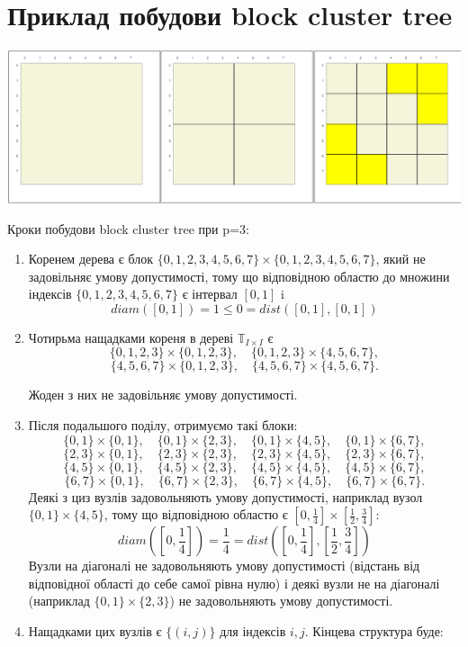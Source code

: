 \documentclass[12pt]{report}
\begin{document}
	\section{Приклад побудови block cluster tree}
	\includegraphics[scale=0.45]{1_3}
	\par Кроки побудови block cluster tree при p=3:
	\begin{enumerate}
	\item Коренем дерева є блок $\{0,1,2,3,4,5,6,7\}\times\{0,1,2,3,4,5,6,7\}$, який не задовільняє умову допустимості, тому що відповідною областю до множини індексів $\{0,1,2,3,4,5,6,7\}$ є інтервал $[0,1]$ i $$diam([0,1])=1\le 0=dist([0,1],[0,1])$$
	\item Чотирьма нащадками кореня в дереві $\mathbb{T}_{I\times I}$ є
	$$\{0,1,2,3\}\times\{0,1,2,3\},\quad\{0,1,2,3\}\times\{4,5,6,7\},$$
	$$\{4,5,6,7\}\times\{0,1,2,3\},\quad\{4,5,6,7\}\times\{4,5,6,7\}.$$
	\par Жоден з них не задовільняє умову допустимості.
	\item Після подальшого поділу, отримуємо такі блоки:
	$$\{0,1\}\times\{0,1\},\quad\{0,1\}\times\{2,3\},\quad\{0,1\}\times\{4,5\},\quad\{0,1\}\times\{6,7\},$$
	$$\{2,3\}\times\{0,1\},\quad\{2,3\}\times\{2,3\},\quad\{2,3\}\times\{4,5\},\quad\{2,3\}\times\{6,7\},$$
	$$\{4,5\}\times\{0,1\},\quad\{4,5\}\times\{2,3\},\quad\{4,5\}\times\{4,5\},\quad\{4,5\}\times\{6,7\},$$
	$$\{6,7\}\times\{0,1\},\quad\{6,7\}\times\{2,3\},\quad\{6,7\}\times\{4,5\},\quad\{6,7\}\times\{6,7\}.$$
	Деякі з циз вузлів задовольняють умову допустимості, наприклад вузол $\{0,1\}\times\{4,5\}$, тому що відповідною областю є $[0,\frac{1}{4}]\times [\frac{1}{2},\frac{3}{4}]$:
	$$diam([0,\frac{1}{4}])=\frac{1}{4}=dist([0,\frac{1}{4}],[\frac{1}{2},\frac{3}{4}])$$
	Вузли на діагоналі не задовольняють умову допустимості (відстань від відповідної області до себе самої рівна нулю) і деякі вузли не на діагоналі (наприклад $\{0,1\}\times \{2,3\}$) не задовольняють умову допустимості.
	\item Нащадками цих вузлів є $\{(i,j)\}$ для індексів $i,j$. 
	Кінцева структура буде:

\end{enumerate}
\end{document}
